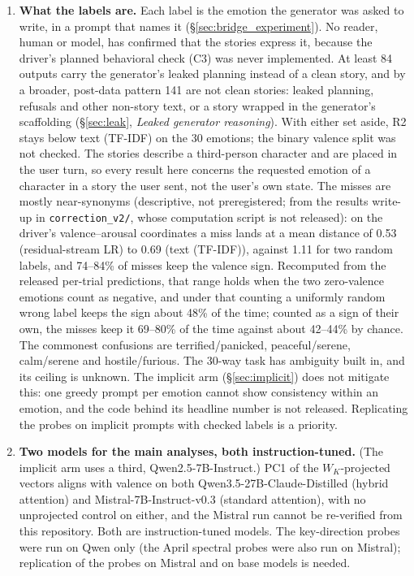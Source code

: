 \documentclass[11pt,a4paper]{article}
\begin{document}
\begin{enumerate}[nosep]
    \item \textbf{What the labels are.} Each label is the emotion the generator was asked to write, in a prompt that names it (\S\ref{sec:bridge_experiment}). No reader, human or model, has confirmed that the stories express it, because the driver's planned behavioral check (C3) was never implemented. At least 84 outputs carry the generator's leaked planning instead of a clean story, and by a broader, post-data pattern 141 are not clean stories: leaked planning, refusals and other non-story text, or a story wrapped in the generator's scaffolding (\S\ref{sec:leak}, \emph{Leaked generator reasoning}). With either set aside, R2 stays below text (TF-IDF) on the 30 emotions; the binary valence split was not checked. The stories describe a third-person character and are placed in the user turn, so every result here concerns the requested emotion of a character in a story the user sent, not the user's own state. The misses are mostly near-synonyms (descriptive, not preregistered; from the results write-up in \texttt{correction\_v2/}, whose computation script is not released): on the driver's valence--arousal coordinates a miss lands at a mean distance of 0.53 (residual-stream LR) to 0.69 (text (TF-IDF)), against 1.11 for two random labels, and 74--84\% of misses keep the valence sign. Recomputed from the released per-trial predictions, that range holds when the two zero-valence emotions count as negative, and under that counting a uniformly random wrong label keeps the sign about 48\% of the time; counted as a sign of their own, the misses keep it 69--80\% of the time against about 42--44\% by chance. The commonest confusions are terrified/panicked, peaceful/serene, calm/serene and hostile/furious. The 30-way task has ambiguity built in, and its ceiling is unknown. The implicit arm (\S\ref{sec:implicit}) does not mitigate this: one greedy prompt per emotion cannot show consistency within an emotion, and the code behind its headline number is not released. Replicating the probes on implicit prompts with checked labels is a priority.

    \item \textbf{Two models for the main analyses, both instruction-tuned.} (The implicit arm uses a third, Qwen2.5-7B-Instruct.) PC1 of the $W_K$-projected vectors aligns with valence on both Qwen3.5-27B-Claude-Distilled (hybrid attention) and Mistral-7B-Instruct-v0.3 (standard attention), with no unprojected control on either, and the Mistral run cannot be re-verified from this repository. Both are instruction-tuned models. The key-direction probes were run on Qwen only (the April spectral probes were also run on Mistral); replication of the probes on Mistral and on base models is needed.


\end{enumerate}
\end{document}
